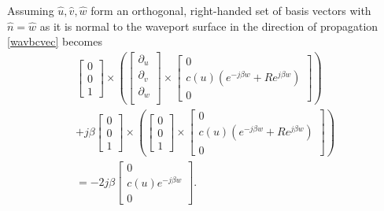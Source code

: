 Assuming $\hat{u},\hat{v},\hat{w}$ form an orthogonal, right-handed set of basis vectors with $\hat{n}=\hat{w}$ as it is normal to the waveport surface in the direction of propagation \ref{wavbcvec} becomes
\begin{multline}
    \begin{bmatrix}
        0 \\ 0 \\ 1
    \end{bmatrix} \times \left(
        \begin{bmatrix}
            \partial_u \\ 
            \partial_v \\
            \partial_w \\ 
        \end{bmatrix} \times 
    \begin{bmatrix}
        0 \\
        c(u)(e^{-j\beta w}+Re^{j\beta w})\\
        0
    \end{bmatrix}\right) \\ +j\beta 
    \begin{bmatrix}
        0 \\ 0 \\ 1
    \end{bmatrix} \times \left(
        \begin{bmatrix}
            0 \\ 0 \\ 1
        \end{bmatrix} \times 
    \begin{bmatrix}
        0 \\
        c(u)(e^{-j\beta w}+Re^{j\beta w})\\
        0
    \end{bmatrix}\right) \\ =-2j\beta
    \begin{bmatrix}
        0 \\
        c(u)e^{-j\beta w}\\
        0
    \end{bmatrix}.
\end{multline}

